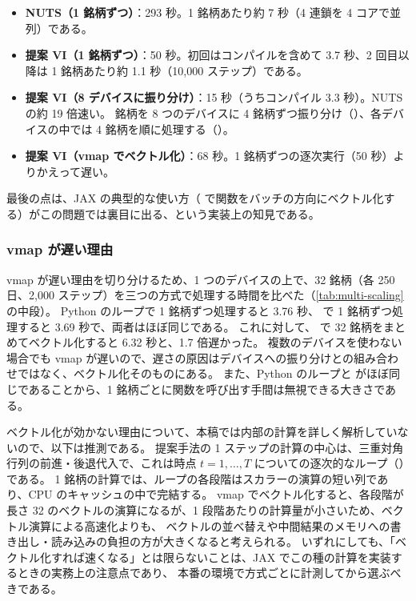 \begin{table}[tbp]
  \centering
  \caption{多銘柄の推定の総時間。上段は\cref{sec:emp-multi}の全期間の推定（コンパイルを含む）。
    中段は 1 デバイス上で 32 銘柄を処理する方式の比較（コンパイルを除く）。
    下段は日次の更新で、初日は全銘柄をゼロから、続く 5 日は warm start で更新したときの、1 日あたりの時間（コンパイルを除く。warm start は 5 日の中央値）。
    128・512 銘柄は、時間の測定のために 32 銘柄を複製したもの。}
  \label{tab:multi-scaling}
  \small
  
\end{table}

\begin{itemize}
  \item \textbf{NUTS（1 銘柄ずつ）}：293 秒。1 銘柄あたり約 7 秒（4 連鎖を 4 コアで並列）である。
  \item \textbf{提案 VI（1 銘柄ずつ）}：50 秒。初回はコンパイルを含めて 3.7 秒、2 回目以降は 1 銘柄あたり約 1.1 秒（10,000 ステップ）である。
  \item \textbf{提案 VI（8 デバイスに振り分け）}：15 秒（うちコンパイル 3.3 秒）。NUTS の約 19 倍速い。
    銘柄を 8 つのデバイスに 4 銘柄ずつ振り分け（）、各デバイスの中では 4 銘柄を順に処理する（）。
  \item \textbf{提案 VI（vmap でベクトル化）}：68 秒。1 銘柄ずつの逐次実行（50 秒）よりかえって遅い。
\end{itemize}

最後の点は、JAX の典型的な使い方（ で関数をバッチの方向にベクトル化する）がこの問題では裏目に出る、という実装上の知見である。

\subsubsection{vmap が遅い理由}

vmap が遅い理由を切り分けるため、1 つのデバイスの上で、32 銘柄（各 250 日、2,000 ステップ）を三つの方式で処理する時間を比べた（\cref{tab:multi-scaling}の中段）。
Python のループで 1 銘柄ずつ処理すると 3.76 秒、 で 1 銘柄ずつ処理すると 3.69 秒で、両者はほぼ同じである。
これに対して、 で 32 銘柄をまとめてベクトル化すると 6.32 秒と、1.7 倍遅かった。
複数のデバイスを使わない場合でも vmap が遅いので、遅さの原因はデバイスへの振り分けとの組み合わせではなく、ベクトル化そのものにある。
また、Python のループと  がほぼ同じであることから、1 銘柄ごとに関数を呼び出す手間は無視できる大きさである。

ベクトル化が効かない理由について、本稿では内部の計算を詳しく解析していないので、以下は推測である。
提案手法の 1 ステップの計算の中心は、三重対角行列の前進・後退代入で、これは時点 $t = 1, \dots, T$ についての逐次的なループ（）である。
1 銘柄の計算では、ループの各段階はスカラーの演算の短い列であり、CPU のキャッシュの中で完結する。
vmap でベクトル化すると、各段階が長さ 32 のベクトルの演算になるが、1 段階あたりの計算量が小さいため、ベクトル演算による高速化よりも、
ベクトルの並べ替えや中間結果のメモリへの書き出し・読み込みの負担の方が大きくなると考えられる。
いずれにしても、「ベクトル化すれば速くなる」とは限らないことは、JAX でこの種の計算を実装するときの実務上の注意点であり、
本番の環境で方式ごとに計測してから選ぶべきである。

